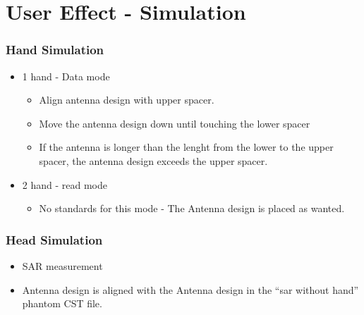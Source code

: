 \section{User Effect - Simulation}


\subsubsection{Hand Simulation}
\begin{itemize}
\item 1 hand - Data mode
\begin{itemize}
\item Align antenna design with upper spacer.
\item Move the antenna design down until touching the lower spacer
\item If the antenna is longer than the lenght from the lower to the upper spacer, the antenna design exceeds the upper spacer.
\end{itemize}
\item 2 hand - read mode
\begin{itemize}
\item No standards for this mode - The Antenna design is placed as wanted.  
\end{itemize}
\end{itemize}

\subsubsection{Head Simulation}
\begin{itemize}
\item SAR measurement
\item Antenna design is aligned with the Antenna design in the ``sar without hand'' phantom CST file.
\end{itemize}
